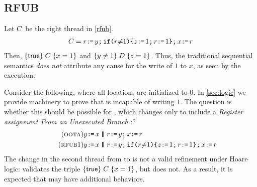 \subsection{RFUB}
Let $C$ be the right thread in \ref{rfub}.
\begin{align*}
  C = r\texttt{:}\mkern-1mu\texttt{=}\, y\texttt{;}\,\allowbreak \texttt{if}\allowbreak\texttt{(}r {\neq} 1\texttt{)} \allowbreak\texttt{\{} z\texttt{:}\mkern-1mu\texttt{=}\, 1\texttt{;}\,\allowbreak r\texttt{:}\mkern-1mu\texttt{=}\, 1\texttt{\}}  \texttt{;}\,\allowbreak x\texttt{:}\mkern-1mu\texttt{=}\, r 
\end{align*}
Then, $\{\mathsf{true}\}\allowbreak\;C\;\allowbreak\{x=1\} $ and $\{y \neq 1\}\allowbreak\;D\;\allowbreak\{z=1\}$.  Thus, the traditional sequential semantics {\em does not} attribute any cause for the write of $1$ to $x$, as seen by the execution:
\begin{tikzdisplay}[node distance=1em]
\end{tikzdisplay}
Consider the
following, where all locations are initialized to $0$.  In \textsection\ref{sec:logic} we provide machinery to prove that \oota{} is
incapable of writing $1$.  The question is whether this should be possible
for \rfub, which changes \oota{} only to include a \emph{Register assignment
  From an Unexecuted Branch} \cite{BoehmOOTA}:?  
\begin{align*}
  \label{oota}  \tag{\textsc{oota}}
  y\GETS x
  \PAR&
  r\GETS y\SEMI
  x\GETS r
  \\
  \tag{\rfub1}
  \label{rfub}
  y\GETS x
  \PAR&
  r\GETS y\SEMI
  \IF{r \NOTEQ 1} \THEN z\GETS 1\SEMI r\GETS 1\FI  \SEMI x\GETS r 
\end{align*}
The change in the second
thread from \oota{} to \rfub{} is not a valid refinement under Hoare logic:
\rfub{} validates the triple $\{\mathsf{true}\}\allowbreak\;C\;\allowbreak\{x=1\}$, but \oota{} does
not.  As a result, it is expected that \rfub{} may have additional behaviors.

